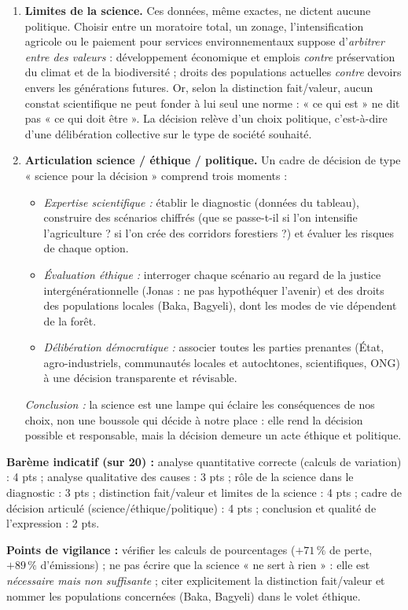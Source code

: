 \documentclass[11pt]{article}
\newcommand{\cle}[1]{{\popxbold\color{popdark}#1}}
\begin{document}
\begin{corrige}
\begin{enumerate}
    \item \textbf{Limites de la science.} Ces données, même exactes, ne dictent aucune politique. Choisir entre un moratoire total, un zonage, l'intensification agricole ou le paiement pour services environnementaux suppose d'\emph{arbitrer entre des valeurs} : développement économique et emplois \emph{contre} préservation du climat et de la biodiversité ; droits des populations actuelles \emph{contre} devoirs envers les générations futures. Or, selon la distinction \cle{fait/valeur}, aucun constat scientifique ne peut fonder à lui seul une norme : « ce qui est » ne dit pas « ce qui doit être ». La décision relève d'un \cle{choix politique}, c'est-à-dire d'une délibération collective sur le type de société souhaité.
    \item \textbf{Articulation science / éthique / politique.} Un cadre de décision de type « science pour la décision » comprend trois moments :
    \begin{itemize}
        \item \emph{Expertise scientifique :} établir le diagnostic (données du tableau), construire des \cle{scénarios} chiffrés (que se passe-t-il si l'on intensifie l'agriculture ? si l'on crée des corridors forestiers ?) et évaluer les risques de chaque option.
        \item \emph{Évaluation éthique :} interroger chaque scénario au regard de la \cle{justice intergénérationnelle} (Jonas : ne pas hypothéquer l'avenir) et des \cle{droits des populations locales} (Baka, Bagyeli), dont les modes de vie dépendent de la forêt.
        \item \emph{Délibération démocratique :} associer toutes les parties prenantes (État, agro-industriels, communautés locales et autochtones, scientifiques, ONG) à une décision transparente et révisable.
    \end{itemize}
    \emph{Conclusion :} la science est une \cle{lampe} qui éclaire les conséquences de nos choix, non une \cle{boussole} qui décide à notre place : elle rend la décision possible et responsable, mais la décision demeure un acte éthique et politique.
\end{enumerate}
\textbf{Barème indicatif (sur 20) :} analyse quantitative correcte (calculs de variation) : 4 pts ; analyse qualitative des causes : 3 pts ; rôle de la science dans le diagnostic : 3 pts ; distinction fait/valeur et limites de la science : 4 pts ; cadre de décision articulé (science/éthique/politique) : 4 pts ; conclusion et qualité de l'expression : 2 pts.

\textbf{Points de vigilance :} vérifier les calculs de pourcentages ($+\num{71}\,\%$ de perte, $+\num{89}\,\%$ d'émissions) ; ne pas écrire que la science « ne sert à rien » : elle est \emph{nécessaire mais non suffisante} ; citer explicitement la distinction fait/valeur et nommer les populations concernées (Baka, Bagyeli) dans le volet éthique.
\end{corrige}
\end{document}
